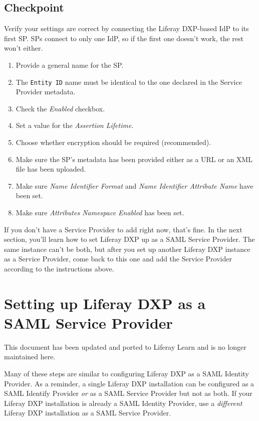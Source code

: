 \section{Checkpoint}\label{checkpoint-3}

Verify your settings are correct by connecting the Liferay DXP-based IdP
to its first SP. SPs connect to only one IdP, so if the first one
doesn't work, the rest won't either.

\begin{enumerate}
\def\labelenumi{\arabic{enumi}.}
\item
  Provide a general name for the SP.
\item
  The \texttt{Entity\ ID} name must be identical to the one declared in
  the Service Provider metadata.
\item
  Check the \emph{Enabled} checkbox.
\item
  Set a value for the \emph{Assertion Lifetime}.
\item
  Choose whether encryption should be required (recommended).
\item
  Make sure the SP's metadata has been provided either as a URL or an
  XML file has been uploaded.
\item
  Make sure \emph{Name Identifier Format} and \emph{Name Identifier
  Attribute Name} have been set.
\item
  Make sure \emph{Attributes Namespace Enabled} has been set.
\end{enumerate}

If you don't have a Service Provider to add right now, that's fine. In
the next section, you'll learn how to set Liferay DXP up as a SAML
Service Provider. The same instance can't be both, but after you set up
another Liferay DXP instance as a Service Provider, come back to this
one and add the Service Provider according to the instructions above.

\chapter{Setting up Liferay DXP as a SAML Service
Provider}\label{setting-up-liferay-dxp-as-a-saml-service-provider}

{This document has been updated and ported to Liferay Learn and is no
longer maintained here.}

Many of these steps are similar to configuring Liferay DXP as a SAML
Identity Provider. As a reminder, a single Liferay DXP installation can
be configured as a SAML Identify Provider \emph{or} as a SAML Service
Provider but not as both. If your Liferay DXP installation is already a
SAML Identity Provider, use a \emph{different} Liferay DXP installation
as a SAML Service Provider.

